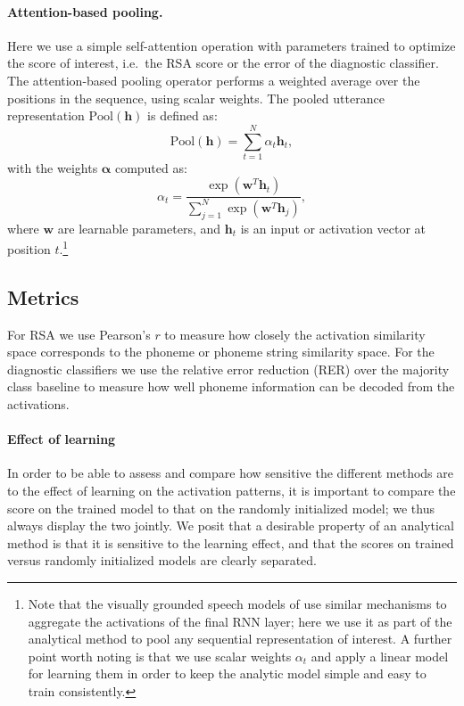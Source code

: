 \paragraph{Attention-based pooling.}  Here we use a simple
self-attention operation with parameters trained to optimize the score
of interest, i.e.\ the RSA score or the error of the diagnostic classifier.
The attention-based pooling operator performs a weighted average
over the positions in the sequence, using scalar weights. The
pooled utterance representation $\mathrm{\text{Pool}}(\mathbf{h})$ is defined as:
\begin{equation}
  \label{eq:pooling1}
  \mathrm{\text{Pool}}(\mathbf{h}) = \sum_{t=1}^N \alpha_t \mathbf{h}_t,
\end{equation}
with the weights $\mathbf{\alpha}$ computed as:
\begin{equation}
  \label{eq:pooling2}
  \alpha_t = \frac{\exp(\mathbf{w}^T\mathbf{h}_t)}{\sum_{j=1}^N \exp(\mathbf{w}^T\mathbf{h}_j)},
\end{equation}
  where $\mathbf{w}$ are learnable parameters, and
  $\mathbf{h}_t$ is an input or activation vector at position $t$.\footnote{Note that the visually grounded speech models of
\citet{chrupala-etal-2017-representations,chrupala-2019-symbolic,Merkx2019} use similar mechanisms to aggregate
the activations of the final RNN layer; here we use it as part of the
analytical method to pool any sequential representation of interest. A
further point worth noting is that we use scalar weights $\alpha_t$ and
apply a linear model for learning them in order to keep the analytic
model simple and easy to train consistently.}

\subsection{Metrics}
\label{sec:metrics}
For RSA we use Pearson's $r$ to measure how closely
the activation similarity space corresponds to the phoneme or phoneme
string similarity space. For the diagnostic classifiers we use the
relative error reduction (RER) over the majority class baseline to
measure how well phoneme information can be decoded from the
activations.
\paragraph{Effect of learning}
In order to be able to assess and compare how sensitive the different
methods are to the effect of learning on the activation patterns, it
is important to compare the score on the trained model to that on the
randomly initialized model; we thus always display the two jointly.
We posit that a desirable property of an analytical method is that it is
sensitive to the learning effect, and that the scores on trained
versus randomly initialized models are clearly separated.

